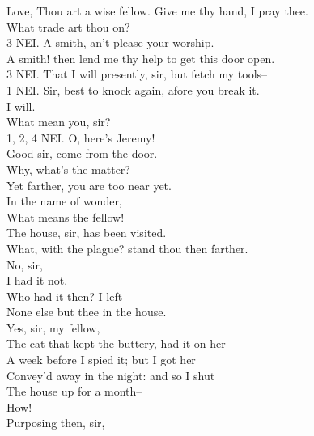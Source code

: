 \documentclass{memoir}
\begin{document}
\begin{drama*}
 Love, Thou art a wise fellow. Give me thy hand, I pray thee.\\
 What trade art thou on?\\
3 NEI. A smith, an't please your worship.\\
\lovewitspeaks {} A smith! then lend me thy help to get this door open.\\
3 NEI. That I will presently, sir, but fetch my tools--\\
1 NEI. Sir, best to knock again, afore you break it.\\
\lovewitspeaks {} I will.\\
\facespeaks  What mean you, sir?\\
1, 2, 4 NEI. O, here's Jeremy!\\
\facespeaks {} Good sir, come from the door.\\
\lovewitspeaks  Why, what's the matter?\\
\facespeaks {} Yet farther, you are too near yet.\\
\lovewitspeaks  In the name of wonder,\\
 What means the fellow!\\
\facespeaks {} The house, sir, has been visited.\\
\lovewitspeaks  What, with the plague? stand thou then farther.\\
\facespeaks {} No, sir,\\
 I had it not.\\
\lovewitspeaks {} Who had it then? I left\\
 None else but thee in the house.\\
\facespeaks {} Yes, sir, my fellow,\\
 The cat that kept the buttery, had it on her\\
 A week before I spied it; but I got her\\
 Convey'd away in the night: and so I shut\\
 The house up for a month--\\
\lovewitspeaks {} How!\\
\facespeaks {} Purposing then, sir,\\

\end{drama*}
\end{document}
